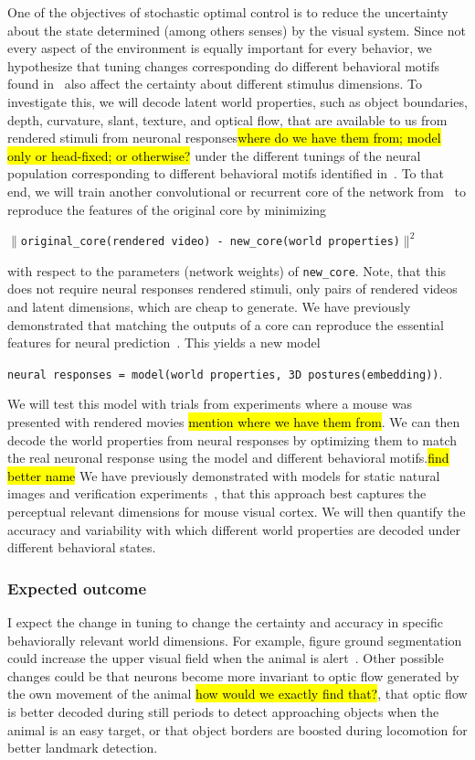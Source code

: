 \documentclass[B2,COG]{ercgrant}
\begin{document}
One of the objectives of stochastic optimal control is to reduce the uncertainty about the state determined (among others senses) by the visual system. 
Since not every aspect of the environment is equally important for every behavior, we hypothesize that tuning changes corresponding do different behavioral motifs found in~ also affect the certainty about different stimulus dimensions. 
To investigate this, we will decode latent world properties, such as object boundaries, depth, curvature, slant, texture, and optical flow, that are available to us from rendered stimuli from neuronal responses\hl{where do we have them from; model only or head-fixed; or otherwise?} under the different tunings of the neural population corresponding to different behavioral motifs identified in~.
To that end, we will train another convolutional or recurrent core of the network from~ to reproduce the features of the original core by minimizing
\begin{center}
    \texttt{$\|$original\_core(rendered video) - new\_core(world properties)$\|^2$}
\end{center}
with respect to the parameters (network weights) of \texttt{new\_core}. 
Note, that this does not require neural responses rendered stimuli, only pairs of rendered videos and latent dimensions, which are cheap to generate. 
We have previously demonstrated that matching the outputs of a core can reproduce the essential features for neural prediction~\parencite{Safarani2021-yy}.
This yields a new model 
\begin{center}
    \texttt{neural responses = model(world properties, 3D postures(embedding))}.
\end{center}
We will test this model with trials from experiments where a mouse was presented with rendered movies \hl{mention where we have them from}. 
We can then decode the world properties from neural responses by optimizing them to match the real neuronal response using the model and different behavioral motifs.\hl{find better name} 
We have previously demonstrated with models for static natural images and verification experiments~\parencite{Cobos2022-rr}, that this approach best captures the perceptual relevant dimensions for mouse visual cortex. 
We will then quantify the accuracy and variability with which different world properties are decoded under different behavioral states. 

\subsubsection{Expected outcome} 
I expect the change in tuning to change the certainty and accuracy in specific behaviorally relevant world dimensions. 
For example, figure ground segmentation could increase the upper visual field when the animal is alert~\parencite[similar to findings in ][]{Franke2022-do}.
Other possible changes could be that neurons become more invariant to optic flow generated by the own movement of the animal \hl{how would we exactly find that?}, that optic flow is better decoded during still periods to detect approaching objects when the animal is an easy target, or that object borders are boosted during locomotion for better landmark detection. 
\end{document}
